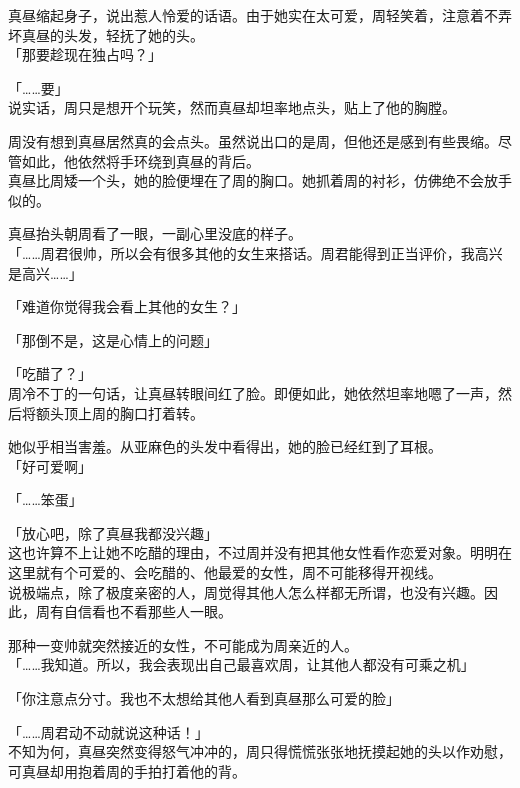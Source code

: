 真昼缩起身子，说出惹人怜爱的话语。由于她实在太可爱，周轻笑着，注意着不弄坏真昼的头发，轻抚了她的头。\\

「那要趁现在独占吗？」

「……要」\\

说实话，周只是想开个玩笑，然而真昼却坦率地点头，贴上了他的胸膛。

周没有想到真昼居然真的会点头。虽然说出口的是周，但他还是感到有些畏缩。尽管如此，他依然将手环绕到真昼的背后。\\

真昼比周矮一个头，她的脸便埋在了周的胸口。她抓着周的衬衫，仿佛绝不会放手似的。

真昼抬头朝周看了一眼，一副心里没底的样子。\\

「……周君很帅，所以会有很多其他的女生来搭话。周君能得到正当评价，我高兴是高兴……」

「难道你觉得我会看上其他的女生？」

「那倒不是，这是心情上的问题」

「吃醋了？」\\

周冷不丁的一句话，让真昼转眼间红了脸。即便如此，她依然坦率地嗯了一声，然后将额头顶上周的胸口打着转。

她似乎相当害羞。从亚麻色的头发中看得出，她的脸已经红到了耳根。\\

「好可爱啊」

「……笨蛋」

「放心吧，除了真昼我都没兴趣」\\

这也许算不上让她不吃醋的理由，不过周并没有把其他女性看作恋爱对象。明明在这里就有个可爱的、会吃醋的、他最爱的女性，周不可能移得开视线。\\

说极端点，除了极度亲密的人，周觉得其他人怎么样都无所谓，也没有兴趣。因此，周有自信看也不看那些人一眼。

那种一变帅就突然接近的女性，不可能成为周亲近的人。\\

「……我知道。所以，我会表现出自己最喜欢周，让其他人都没有可乘之机」

「你注意点分寸。我也不太想给其他人看到真昼那么可爱的脸」

「……周君动不动就说这种话！」\\

不知为何，真昼突然变得怒气冲冲的，周只得慌慌张张地抚摸起她的头以作劝慰，可真昼却用抱着周的手拍打着他的背。\\

